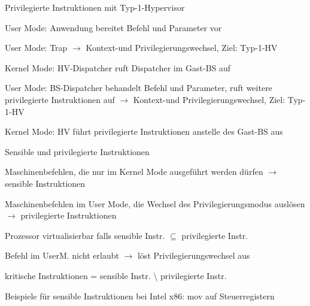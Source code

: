 \documentclass[a4paper]{article}
\begin{document}
\begin{multicols}{3}
    Privilegierte Instruktionen mit Typ-1-Hypervisor
    \begin{enumerate*}
        \item User Mode: Anwendung bereitet Befehl und Parameter vor
        \item User Mode: Trap $\rightarrow$ Kontext-und Privilegierungswechsel, Ziel: Typ-1-HV
        \item Kernel Mode: HV-Dispatcher ruft Dispatcher im Gast-BS auf
        \item User Mode: BS-Dispatcher behandelt Befehl und Parameter, ruft weitere privilegierte Instruktionen auf $\rightarrow$ Kontext-und Privilegierungswechsel, Ziel: Typ-1-HV
        \item Kernel Mode: HV führt privilegierte Instruktionen anstelle des Gast-BS aus
    \end{enumerate*}

    Sensible und privilegierte Instruktionen
    \begin{itemize*}
        \item Maschinenbefehlen, die nur im Kernel Mode ausgeführt werden dürfen $\rightarrow$ sensible Instruktionen
        \item Maschinenbefehlen im User Mode, die Wechsel des Privilegierungsmodus auslösen $\rightarrow$ privilegierte Instruktionen
        \item Prozessor virtualisierbar falls sensible Instr. $\subseteq$ privilegierte Instr.
        \item Befehl im UserM. nicht erlaubt $\rightarrow$ löst Privilegierungswechsel aus
        \item kritische Instruktionen = sensible Instr. \textbackslash{} privilegierte Instr.
        \item Beispiele für sensible Instruktionen bei Intel x86: mov auf Steuerregistern
    \end{itemize*}



\end{multicols}
\end{document}
